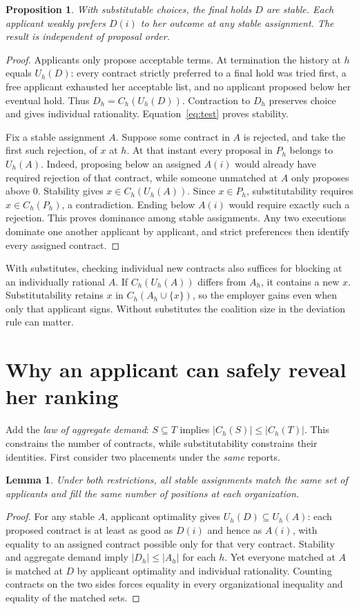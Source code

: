 \documentclass[11pt]{article}
\newtheorem{proposition}{Proposition}
\newtheorem{lemma}{Lemma}
\begin{document}
\begin{proposition}
With substitutable choices, the final holds $D$ are stable. Each applicant weakly prefers $D(i)$ to her outcome at any stable assignment. The result is independent of proposal order.
\end{proposition}
\begin{proof}
Applicants only propose acceptable terms. At termination the history at $h$ equals $U_h(D)$: every contract strictly preferred to a final hold was tried first, a free applicant exhausted her acceptable list, and no applicant proposed below her eventual hold. Thus $D_h=C_h(U_h(D))$. Contraction to $D_h$ preserves choice and gives individual rationality. Equation~\eqref{eq:test} proves stability.

Fix a stable assignment $A$. Suppose some contract in $A$ is rejected, and take the first such rejection, of $x$ at $h$. At that instant every proposal in $P_h$ belongs to $U_h(A)$. Indeed, proposing below an assigned $A(i)$ would already have required rejection of that contract, while someone unmatched at $A$ only proposes above $0$. Stability gives $x\in C_h(U_h(A))$. Since $x\in P_h$, substitutability requires $x\in C_h(P_h)$, a contradiction. Ending below $A(i)$ would require exactly such a rejection. This proves dominance among stable assignments. Any two executions dominate one another applicant by applicant, and strict preferences then identify every assigned contract.
\end{proof}

With substitutes, checking individual new contracts also suffices for blocking at an individually rational $A$. If $C_h(U_h(A))$ differs from $A_h$, it contains a new $x$. Substitutability retains $x$ in $C_h(A_h\cup\{x\})$, so the employer gains even when only that applicant signs. Without substitutes the coalition size in the deviation rule can matter.

\section{Why an applicant can safely reveal her ranking}
Add the \emph{law of aggregate demand}: $S\subseteq T$ implies $|C_h(S)|\leq |C_h(T)|$. This constrains the number of contracts, while substitutability constrains their identities. First consider two placements under the \emph{same} reports.

\begin{lemma}
Under both restrictions, all stable assignments match the same set of applicants and fill the same number of positions at each organization.
\end{lemma}
\begin{proof}
For any stable $A$, applicant optimality gives $U_h(D)\subseteq U_h(A)$: each proposed contract is at least as good as $D(i)$ and hence as $A(i)$, with equality to an assigned contract possible only for that very contract. Stability and aggregate demand imply $|D_h|\leq |A_h|$ for each $h$. Yet everyone matched at $A$ is matched at $D$ by applicant optimality and individual rationality. Counting contracts on the two sides forces equality in every organizational inequality and equality of the matched sets.
\end{proof}
\end{document}
